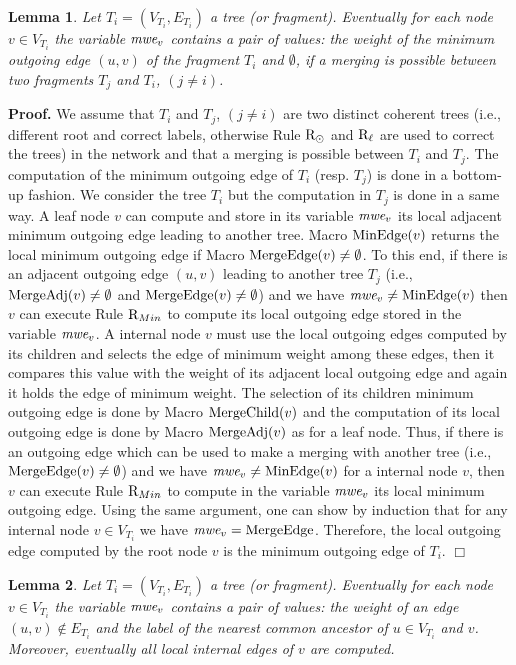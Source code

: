 \documentclass[11pt,a4paper]{article}
\newtheorem{lemma}{Lemma}
\newenvironment{proof}{\noindent \begin{rm}{\textbf{Proof.} }}{\hspace*{\fill}$\Box$\par\end{rm}}
\newcommand{\m}{\mbox{\it mwe}}
\newcommand{\MinEdge}{\mbox{\rm MinEdge}}
\newcommand{\FC}{\mbox{\rm MergeChild}}
\newcommand{\FA}{\mbox{\rm MergeAdj}}
\newcommand{\Fusion}{\mbox{\rm MergeEdge}}
\newcommand{\RRoot}{\mbox{\rm R$_{\odot}$}} 	\newcommand{\RRLC}{\mbox{\rm R$_{\ell_{\odot}}$}}\newcommand{\RLC}{\mbox{\rm R$_{\ell}$}} \newcommand{\RMin}{\mbox{\rm R$_{Min}$}}
\begin{document}
\begin{lemma}
\label{lem:mwoe_computation}
Let $T_i=(V_{T_i},E_{T_i})$ a tree (or fragment). Eventually for each node $v \in V_{T_i}$ the variable $\m_v$ contains a pair of values: the weight of the minimum outgoing edge $(u,v)$ of the fragment $T_i$ and $\emptyset$, if a merging is possible between two fragments $T_j$ and $T_i$, $(j\neq i)$.
\end{lemma}

\begin{proof}
We assume that $T_i$ and $T_j$, $(j\neq i)$ are two distinct coherent trees (i.e., different root and correct labels, otherwise Rule $\RRoot$ and $\RLC$ are used to correct the trees) in the network and that a merging is possible between $T_i$ and $T_j$. The computation of the minimum outgoing edge of $T_i$ (resp. $T_j$) is done in a bottom-up fashion. We consider the tree $T_i$ but the computation in $T_j$ is done in a same way. A leaf node $v$ can compute and store in its variable $\m_v$ its local adjacent minimum outgoing edge leading to another tree. Macro $\MinEdge(v)$ returns the local minimum outgoing edge if Macro $\Fusion(v) \neq \emptyset$. To this end, if there is an adjacent outgoing edge $(u,v)$ leading to another tree $T_j$ (i.e., $\FA(v) \neq \emptyset$ and $\Fusion(v) \neq \emptyset$) and we have $\m_v \neq \MinEdge(v)$ then $v$ can execute Rule $\RMin$ to compute its local outgoing edge stored in the variable $\m_v$. A internal node $v$ must use the local outgoing edges computed by its children and selects the edge of minimum weight among these edges, then it compares this value with the weight of its adjacent local outgoing edge and again it holds the edge of minimum weight. The selection of its children minimum outgoing edge is done by Macro $\FC(v)$ and the computation of its local outgoing edge is done by Macro $\FA(v)$ as for a leaf node. Thus, if there is an outgoing edge which can be used to make a merging with another tree (i.e., $\Fusion(v) \neq \emptyset$) and we have $\m_v \neq \MinEdge(v)$ for a internal node $v$, then $v$ can execute Rule $\RMin$ to compute in the variable $\m_v$ its local minimum outgoing edge. Using the same argument, one can show by induction that for any internal node $v \in V_{T_i}$ we have $\m_v=\Fusion$. Therefore, the local outgoing edge computed by the root node $v$ is the minimum outgoing edge of $T_i$.
\end{proof}

\begin{lemma}
\label{lem:recover_computation}
Let $T_i=(V_{T_i},E_{T_i})$ a tree (or fragment). Eventually for each node $v \in V_{T_i}$ the variable $\m_v$ contains a pair of values: the weight of an edge $(u,v) \not \in E_{T_i}$ and the label of the nearest common ancestor of $u \in V_{T_i}$ and $v$. Moreover, eventually all local internal edges of $v$ are computed.
\end{lemma}
\end{document}
